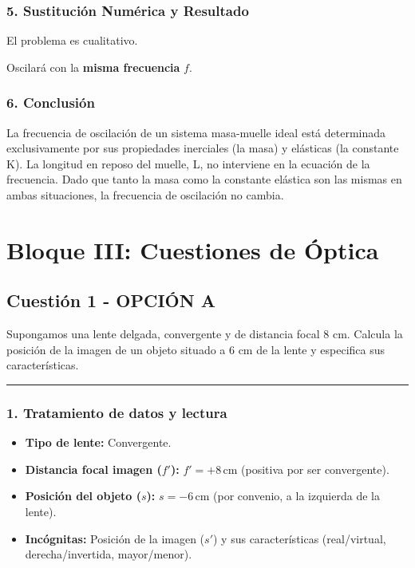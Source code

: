 \subsubsection*{5. Sustitución Numérica y Resultado}
El problema es cualitativo.
\begin{cajaresultado}
Oscilará con la \textbf{misma frecuencia} $f$.
\end{cajaresultado}

\subsubsection*{6. Conclusión}
\begin{cajaconclusion}
La frecuencia de oscilación de un sistema masa-muelle ideal está determinada exclusivamente por sus propiedades inerciales (la masa) y elásticas (la constante K). La longitud en reposo del muelle, L, no interviene en la ecuación de la frecuencia. Dado que tanto la masa como la constante elástica son las mismas en ambas situaciones, la frecuencia de oscilación no cambia.
\end{cajaconclusion}

\newpage

\section{Bloque III: Cuestiones de Óptica}
\label{sec:optica_2008_jun_ord}

\subsection{Cuestión 1 - OPCIÓN A}
\label{subsec:3A_2008_jun_ord}
\begin{cajaenunciado}
Supongamos una lente delgada, convergente y de distancia focal 8 cm. Calcula la posición de la imagen de un objeto situado a 6 cm de la lente y especifica sus características.
\end{cajaenunciado}
\hrule

\subsubsection*{1. Tratamiento de datos y lectura}
\begin{itemize}
    \item \textbf{Tipo de lente:} Convergente.
    \item \textbf{Distancia focal imagen ($f'$):} $f' = +8\,\text{cm}$ (positiva por ser convergente).
    \item \textbf{Posición del objeto ($s$):} $s = -6\,\text{cm}$ (por convenio, a la izquierda de la lente).
    \item \textbf{Incógnitas:} Posición de la imagen ($s'$) y sus características (real/virtual, derecha/invertida, mayor/menor).
\end{itemize}

